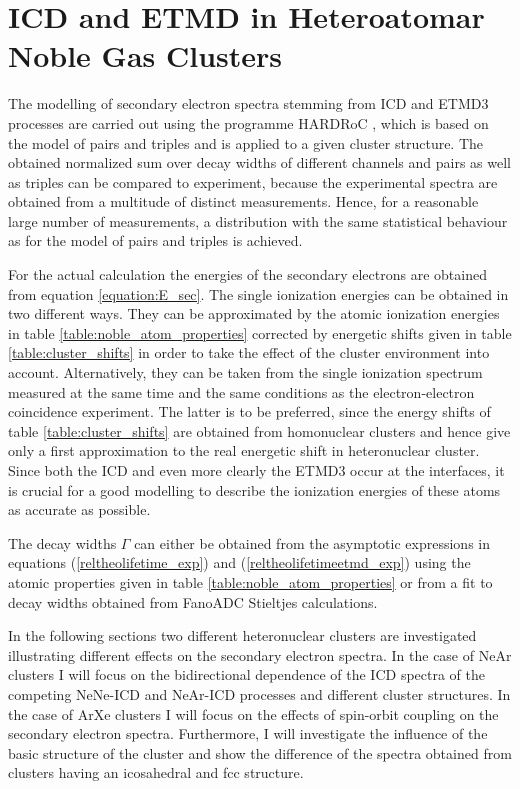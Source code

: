 \chapter{ICD and ETMD in Heteroatomar Noble Gas Clusters}
\label{chapter_NeArclusters}

The modelling of secondary electron spectra stemming from \ac{ICD}
and \ac{ETMD}3 processes are carried out using the programme
HARDRoC \cite{HARDRoC}, which is based on the model of pairs and
triples and is applied to a given cluster structure. The obtained
normalized sum over decay widths of different channels
and pairs as well as triples can be compared to experiment, because the
experimental spectra are obtained from a multitude of distinct measurements.
Hence, for a reasonable large number of measurements, a distribution with the
same statistical behaviour as for the model of pairs and triples is achieved.

For the actual calculation the energies of the secondary electrons are obtained
from equation \ref{equation:E_sec}. The single ionization energies
can be obtained in two different ways. They can be
approximated by the atomic ionization energies in table
\ref{table:noble_atom_properties} corrected by energetic shifts
given in table \ref{table:cluster_shifts} in order to take
the effect of the cluster environment into account. 
Alternatively, they can be taken from the single ionization spectrum
measured at the same time and the same conditions as the electron-electron
coincidence experiment. The latter is to be preferred, since the energy shifts
of table \ref{table:cluster_shifts} are obtained from homonuclear clusters and
hence give only a first approximation to the real energetic shift in
heteronuclear cluster. Since both the \ac{ICD} and even more clearly the
\ac{ETMD}3 occur at the interfaces, it is crucial for a good modelling to
describe the ionization energies of these atoms as accurate as possible.

The decay widths $\Gamma$ can either be obtained from the asymptotic expressions
in equations (\ref{reltheolifetime_exp}) and (\ref{reltheolifetimeetmd_exp})
using the atomic properties given in table \ref{table:noble_atom_properties}
or from a fit to decay widths obtained from FanoADC Stieltjes calculations.

In the following sections two different heteronuclear clusters are investigated
illustrating different effects on the secondary electron spectra.
In the case of NeAr clusters I will focus on the bidirectional dependence of
the ICD spectra of the competing NeNe-ICD and NeAr-ICD processes and
different cluster structures. 
In the case of ArXe clusters I will focus on the effects of spin-orbit coupling
on the secondary electron spectra. Furthermore, I will investigate the influence
of the basic structure of the cluster and show the difference of the spectra
obtained from clusters having an icosahedral
and \ac{fcc} structure.





